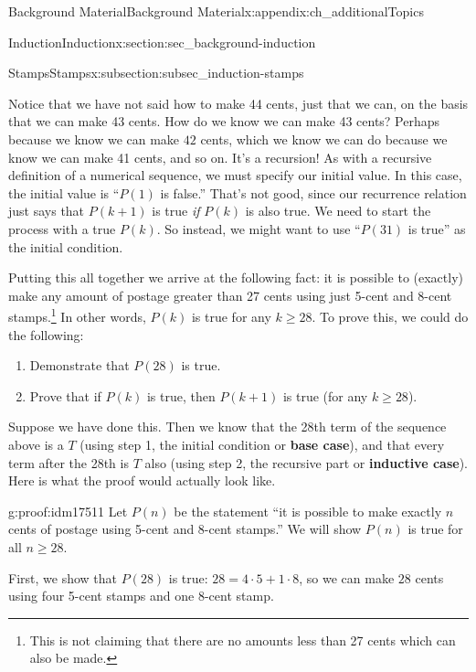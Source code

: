 \documentclass[oneside,10pt,]{book}
\newcommand{\terminology}[1]{\textbf{#1}}
\numberwithin{equation}{chapter}
\begin{document}
\begin{appendixptx}{Background Material}{}{Background Material}{}{}{x:appendix:ch_additionalTopics}
\begin{sectionptx}{Induction}{}{Induction}{}{}{x:section:sec_background-induction}
\begin{subsectionptx}{Stamps}{}{Stamps}{}{}{x:subsection:subsec_induction-stamps}
\par
Notice that we have not said how to make 44 cents, just that we can, on the basis that we can make 43 cents. How do we know we can make 43 cents? Perhaps because we know we can make \(42\)\label{g:notation:idm17482} cents, which we know we can do because we know we can make 41 cents, and so on. It's a recursion! As with a recursive definition of a numerical sequence, we must specify our initial value. In this case, the initial value is ``\(P(1)\) is false.'' That's not good, since our recurrence relation just says that \(P(k+1)\) is true \emph{if} \(P(k)\) is also true. We need to start the process with a true \(P(k)\). So instead, we might want to use ``\(P(31)\) is true'' as the initial condition.%
\par
Putting this all together we arrive at the following fact: it is possible to (exactly) make any amount of postage greater than 27 cents using just 5-cent and 8-cent stamps.\footnote{This is not claiming that there are no amounts less than 27 cents which can also be made.\label{g:fn:idm17494}} In other words, \(P(k)\) is true for any \(k \ge 28\). To prove this, we could do the following:%
\begin{enumerate}
\item{}Demonstrate that \(P(28)\) is true.%
\item{}Prove that if \(P(k)\) is true, then \(P(k+1)\) is true (for any \(k \ge 28\)).%
\end{enumerate}
%
\par
Suppose we have done this. Then we know that the 28th term of the sequence above is a \(T\) (using step 1, the initial condition or \terminology{base case}), and that every term after the 28th is \(T\) also (using step 2, the recursive part or \terminology{inductive case}). Here is what the proof would actually look like.%
\begin{proofptx}{}{g:proof:idm17511}
Let \(P(n)\) be the statement ``it is possible to make exactly \(n\) cents of postage using 5-cent and 8-cent stamps.'' We will show \(P(n)\) is true for all \(n \ge 28\).%
\par
First, we show that \(P(28)\) is true: \(28 =  4 \cdot 5+ 1\cdot 8\), so we can make \(28\) cents using four 5-cent stamps and one 8-cent stamp.%
\par

\end{proofptx}
\end{subsectionptx}
\end{sectionptx}
\end{appendixptx}
\end{document}
